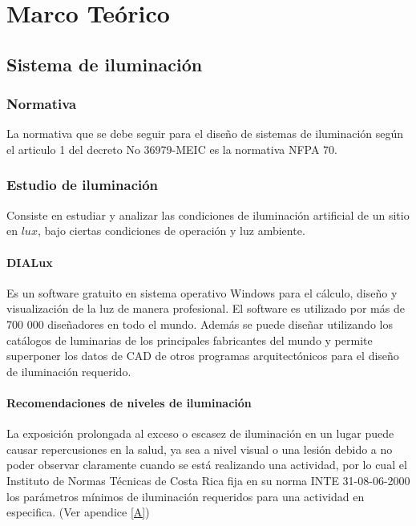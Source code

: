   \chapter{Marco Teórico} 
\label{C:antecedentes}


\section{Sistema de iluminación}

\subsection{Normativa}

La normativa que se debe seguir para el diseño de sistemas de iluminación según el articulo 1 del decreto No 36979-MEIC es la normativa NFPA 70. \cite{MEIC}




\subsection{Estudio de iluminación}

Consiste en estudiar y analizar las condiciones de iluminación artificial de un sitio en $lux$, bajo ciertas condiciones de operación y luz ambiente.

\subsubsection{DIALux}


Es un software gratuito en sistema operativo Windows para el cálculo, diseño y visualización de la luz de manera profesional. El software es utilizado por más de 700 000 diseñadores en todo el mundo. Además se puede diseñar utilizando los catálogos de luminarias de los principales fabricantes del mundo y permite superponer los datos de CAD de otros programas arquitectónicos para el diseño de iluminación requerido. \cite{DIALux}


\subsubsection{Recomendaciones de niveles de iluminación}

La exposición prolongada al exceso o escasez de iluminación en un lugar puede causar repercusiones en la salud, ya sea a nivel visual o una lesión debido a no poder observar claramente cuando se está realizando una actividad, por lo cual el Instituto de Normas Técnicas de Costa Rica fija en su norma INTE 31-08-06-2000 los parámetros mínimos de iluminación requeridos para una actividad en especifica. (Ver apendice \ref{A}) \cite{Inteco}\\
 



